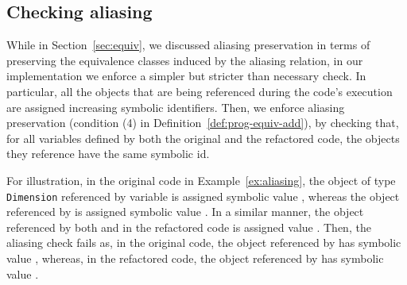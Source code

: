 \documentclass[sigconf,review,anonymous]{acmart}
\begin{document}




  
 





\subsection{Checking aliasing}

While in Section~\ref{sec:equiv}, we discussed aliasing preservation in terms of
preserving the equivalence classes induced by the aliasing relation,
in our implementation we enforce a simpler but stricter  than necessary check.
In particular, all the objects
that are being referenced during the code's execution
are assigned increasing symbolic identifiers.
Then, we enforce aliasing preservation (condition (4) in Definition~\ref{def:prog-equiv-add}),
by checking that, for all variables defined by both the original and the refactored code,
the objects they reference have the same symbolic id.

For illustration, in the original code in Example~\ref{ex:aliasing}, the object of type \lstinline[breaklines=true]{Dimension} referenced by variable 
is assigned symbolic value , whereas the object referenced by  is assigned symbolic value .
In a similar manner, the object referenced by both  and  in the refactored code is assigned value .
Then, the aliasing check fails as, in the original code, the object referenced by  has symbolic value ,
whereas, in the refactored code, the object referenced by  has symbolic value .
\end{document}
